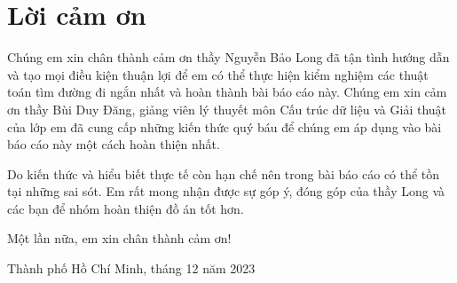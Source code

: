 \section*{Lời cảm ơn}
Chúng em xin chân thành cảm ơn thầy Nguyễn Bảo Long đã tận tình hướng dẫn và tạo mọi điều kiện thuận lợi để em có thể thực hiện kiểm nghiệm các thuật toán tìm đường đi ngắn nhất và hoàn thành bài báo cáo này. Chúng em xin cảm ơn thầy Bùi Duy Đăng, giảng viên lý thuyết môn Cấu trúc dữ liệu và Giải thuật của lớp em đã cung cấp những kiến thức quý báu để chúng em áp dụng vào bài báo cáo này một cách hoàn thiện nhất.

Do kiến thức và hiểu biết thực tế còn hạn chế nên trong bài báo cáo có thể tồn tại những sai sót. Em rất mong nhận được sự góp ý, đóng góp của thầy Long và các bạn để nhóm hoàn thiện đồ án tốt hơn.

Một lần nữa, em xin chân thành cảm ơn!


\begin{flushright}
Thành phố Hồ Chí Minh, tháng 12 năm 2023
\end{flushright}